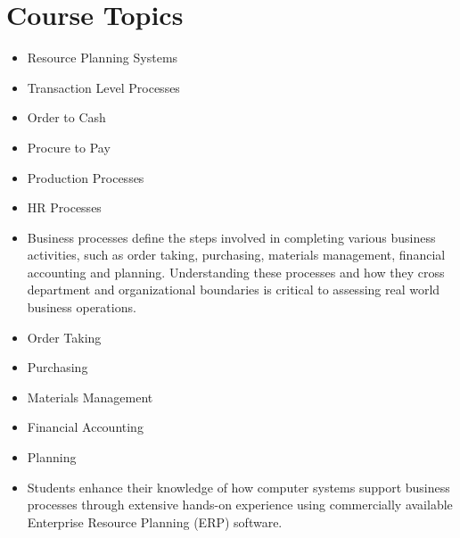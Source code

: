 \section{Course Topics}
\begin{itemize}
    \item Resource Planning Systems
    \item   Transaction Level Processes
    \item   Order to Cash
    \item   Procure to Pay
    \item   Production Processes
    \item   HR Processes
    \item  Business processes define the steps involved in completing various business activities, such as order taking, purchasing, materials management, financial accounting and planning. Understanding these processes and how they cross department and organizational boundaries is critical to assessing real world business operations. 
    \item   Order Taking
    \item   Purchasing
    \item   Materials Management
    \item   Financial Accounting
    \item   Planning
    \item Students enhance their knowledge of how computer systems support business processes through extensive hands-on experience using commercially available Enterprise Resource Planning (ERP) software.
\end{itemize}    
    \newpage
